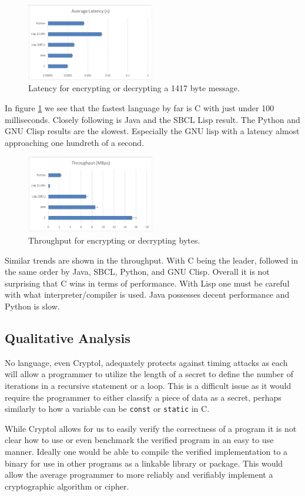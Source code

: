 \begin{figure}
\centerline{ 
\includegraphics[width = 0.5\textwidth]{latency.PNG}}
\caption{Latency for encrypting or decrypting a 1417 byte message.}
\label{fig:lan}
\end{figure}

In figure \ref{fig:lan} we see that the fastest language by far is C with just under 100 milliseconds. Closely following is Java and the SBCL Lisp result. The Python and GNU Clisp results are the slowest. Especially the GNU lisp with a latency almost approaching one hundreth of a second.

\begin{figure}
\centerline{ 
\includegraphics[width = 0.5\textwidth]{throughput.PNG}}
\caption{Throughput for encrypting or decrypting bytes.}
\label{fig:ban}
\end{figure}

Similar trends are shown in the throughput. With C being the leader, followed in the same order by Java, SBCL, Python, and GNU Clisp. Overall it is not surprising that C wins in terms of performance. With Lisp one must be careful with what interpreter/compiler is used. Java possesses decent performance and Python is slow.

\subsection{Qualitative Analysis}

No language, even Cryptol, adequately protects against timing attacks as each will allow a programmer to utilize the length of a secret 
to define the number of iterations in a recursive statement or a loop. This is a difficult issue as it would require the programmer to 
either classify a piece of data as a secret, perhaps similarly to how a variable can be \texttt{const} or \texttt{static} in C.

While Cryptol allows for us to easily verify the correctness of a program it is not clear how to use or even benchmark the verified program 
in an easy to use manner. Ideally one would be able to compile the verified implementation to a binary for use in other programs as a linkable 
library or package. This would allow the average programmer to more reliably and verifiably implement a cryptographic algorithm or cipher.
